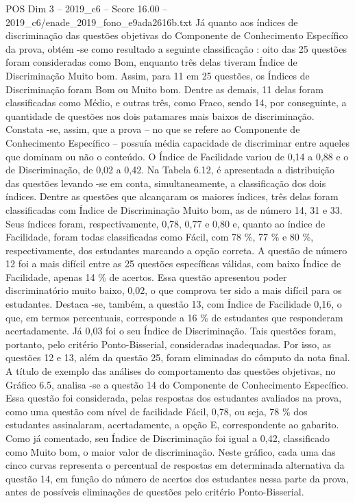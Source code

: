\begin{textsample}{POS Dim 3 – 2019\_c6 – Score 16.00 – 2019\_c6/enade\_2019\_fono\_e9ada2616b.txt}
Já quanto aos índices de discriminação das questões objetivas do Componente de Conhecimento Específico da prova, obtém -se como resultado a seguinte classificação : oito das 25 questões foram consideradas como Bom, enquanto três delas tiveram Índice de Discriminação Muito bom.
Assim, para 11 em 25 questões, os Índices de Discriminação foram Bom ou Muito bom.
Dentre as demais, 11 delas foram classificadas como Médio, e outras três, como Fraco, sendo 14, por conseguinte, a quantidade de questões nos dois patamares mais baixos de discriminação.
Constata -se, assim, que a prova – no que se refere ao Componente de Conhecimento Específico – possuía média capacidade de discriminar entre aqueles que dominam ou não o conteúdo.
O Índice de Facilidade variou de 0,14 a 0,88 e o de Discriminação, de 0,02 a 0,42.
Na Tabela 6.12, é apresentada a distribuição das questões levando -se em conta, simultaneamente, a classificação dos dois índices.
Dentre as questões que alcançaram os maiores índices, três delas foram classificadas com Índice de Discriminação Muito bom, as de número 14, 31 e 33.
Seus índices foram, respectivamente, 0,78, 0,77 e 0,80 e, quanto ao índice de Facilidade, foram todas classificadas como Fácil, com 78 \%, 77 \% e 80 \%, respectivamente, dos estudantes marcando a opção correta.
A questão de número 12 foi a mais difícil entre as 25 questões específicas válidas, com baixo Índice de Facilidade, apenas 14 \% de acertos.
Essa questão apresentou poder discriminatório muito baixo, 0,02, o que comprova ter sido a mais difícil para os estudantes.
Destaca -se, também, a questão 13, com Índice de Facilidade 0,16, o que, em termos percentuais, corresponde a 16 \% de estudantes que responderam acertadamente.
Já 0,03 foi o seu Índice de Discriminação.
Tais questões foram, portanto, pelo critério Ponto-Bisserial, consideradas inadequadas.
Por isso, as questões 12 e 13, além da questão 25, foram eliminadas do cômputo da nota final.
A título de exemplo das análises do comportamento das questões objetivas, no Gráfico 6.5, analisa -se a questão 14 do Componente de Conhecimento Específico.
Essa questão foi considerada, pelas respostas dos estudantes avaliados na prova, como uma questão com nível de facilidade Fácil, 0,78, ou seja, 78 \% dos estudantes assinalaram, acertadamente, a opção E, correspondente ao gabarito.
Como já comentado, seu Índice de Discriminação foi igual a 0,42, classificado como Muito bom, o maior valor de discriminação.
Neste gráfico, cada uma das cinco curvas representa o percentual de respostas em determinada alternativa da questão 14, em função do número de acertos dos estudantes nessa parte da prova, antes de possíveis eliminações de questões pelo critério Ponto-Bisserial.

\end{textsample}
